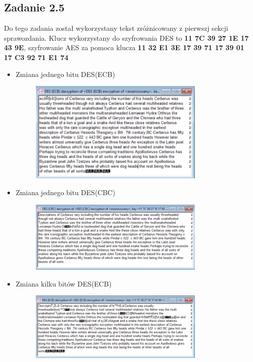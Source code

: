 \documentclass{article}
\begin{document}
\subsection{Zadanie 2.5}
Do tego zadania został wykorzystany tekst zróżnicowany z pierwszj sekcji sprawozdania. Klucz wykorzystany do szyfrowania DES to \textbf{11 7C 39 27 1E 17 43 9E}, szyfrowanie AES za pomoca klucza \textbf{11 32 E1 3E 17 39 71 17 39 01 17 C3 92 71 E1 74}

\begin{itemize}
    \item Zmiana jednego bitu DES(ECB)
    \begin{figure}[H]
        \centering
        \label{fig:zmiana_jednego_bitu_ecb}
        \includegraphics[width=0.8\textwidth]{zmiana_jednego_bitu.png}
    \end{figure}
    \item Zmiana jednego bitu DES(CBC)
    \begin{figure}[H]
        \centering
        \label{fig:zmiana_jednego_bitu_cbc}
        \includegraphics[width=0.8\textwidth]{zmiana_jednego_bitu_cbc.png}
    \end{figure}
    \item Zmiana kilku bitów DES(ECB)
    \begin{figure}[H]
        \centering
        \includegraphics[width=0.8\textwidth]{zmiana_kilku_bitow.png}

\end{figure}
\end{itemize}
\end{document}
